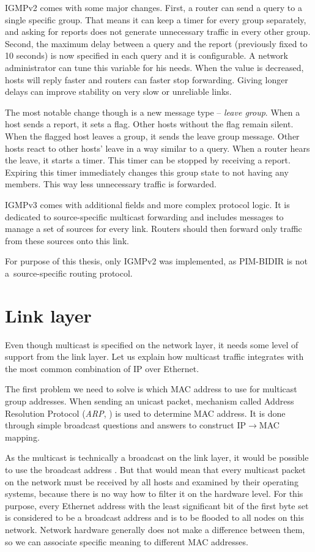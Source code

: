IGMPv2 \cite{rfc2236} comes with some major changes. First, a router can send
a query to a single specific group. That means it can keep a timer for every group
separately, and asking for reports does not generate unnecessary traffic in
every other group. Second, the maximum delay between a query and the report
(previously fixed to 10 seconds) is now specified in each query and it is
configurable. A network administrator can tune this variable for his needs.
When the value is decreased, hosts will reply faster and routers can faster stop
forwarding. Giving longer delays can improve stability on very slow or
unreliable links.

The most notable change though is a new message type -- \emph{leave group}. When a host
sends a report, it sets a flag. Other hosts without the flag remain silent. When
the flagged host leaves a group, it sends the leave group message. Other hosts
react to other hosts' leave in a way similar to a query. When a router hears the leave,
it starts a timer. This timer can be stopped by receiving a report. Expiring this
timer immediately changes this group state to not having any members. This way
less unnecessary traffic is forwarded.

IGMPv3 comes with additional fields and more complex protocol logic. It is
dedicated to source-specific multicast forwarding and includes messages to manage
a set of sources for every link. Routers should then forward only traffic from
these sources onto this link.

For purpose of this thesis, only IGMPv2 was implemented, as PIM-BIDIR is not
a~source-specific routing protocol.

\section{Link layer}

Even though multicast is specified on the network layer, it needs some level of
support from the link layer. Let us explain how multicast traffic integrates with
the most common combination of IP over Ethernet.

The first problem we need to solve is which MAC address to use for multicast
group addresses. When sending an unicast packet, mechanism called Address
Resolution Protocol (\emph{ARP}, ) is used to determine MAC address. It is done
through simple broadcast questions and answers to construct IP$\rightarrow$MAC mapping.

As the multicast is technically a broadcast on the link layer, it would be possible to
use the broadcast address .
But that would mean that every multicast packet on the network must be received by all
hosts and examined by their operating systems, because there is no way how to filter
it on the hardware level. For this purpose, every Ethernet address with the
least significant bit of the first byte set is considered to be
a broadcast address and is to be flooded to all nodes on this network. Network
hardware generally does not make a difference between them, so we can associate
specific meaning to different MAC addresses.

